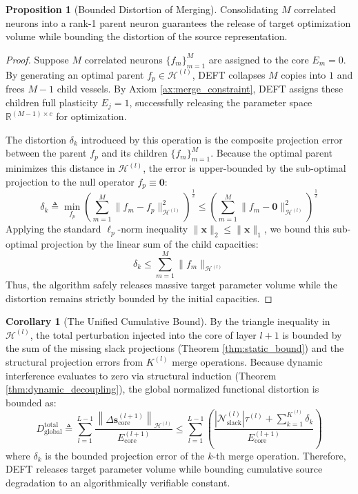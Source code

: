 \documentclass[11pt, a4paper, copyright, gdm]{google}
\newcommand{\norm}[1]{\left\lVert#1\right\rVert}
\newcommand{\sVect}{\boldsymbol{s}}
\newcommand{\xVect}{\boldsymbol{x}}
\newcommand{\zeroVect}{\boldsymbol{0}}
\newcommand{\calH}{\mathcal{H}}
\newcommand{\calN}{\mathcal{N}}
\theoremstyle{definition}
\newtheorem{proposition}[theorem]{Proposition}
\newtheorem{corollary}[theorem]{Corollary}
\begin{document}
\begin{proposition}[Bounded Distortion of Merging]
\label{prop:epsilon_tradeoff}
Consolidating $M$ correlated neurons into a rank-1 parent neuron guarantees the release of target optimization volume while bounding the distortion of the source representation.
\end{proposition}

\begin{proof}
Suppose $M$ correlated neurons $\{f_m\}_{m=1}^M$ are assigned to the core $E_m = 0$. By generating an optimal parent $f_p \in \calH^{(l)}$, DEFT collapses $M$ copies into $1$ and frees $M-1$ child vessels. By Axiom \ref{ax:merge_constraint}, DEFT assigns these children full plasticity $E_j = 1$, successfully releasing the parameter space $\mathbb{R}^{(M-1) \times c}$ for optimization.

The distortion $\delta_k$ introduced by this operation is the composite projection error between the parent $f_p$ and its children $\{f_m\}_{m=1}^M$. Because the optimal parent minimizes this distance in $\calH^{(l)}$, the error is upper-bounded by the sub-optimal projection to the null operator $f_p \equiv \zeroVect$:
\begin{equation}
    \delta_k \triangleq \min_{f_p} \left( \sum_{m=1}^M \|f_m - f_p\|_{\calH^{(l)}}^2 \right)^{\frac{1}{2}} \le \left( \sum_{m=1}^M \|f_m - \zeroVect\|_{\calH^{(l)}}^2 \right)^{\frac{1}{2}}
\end{equation}
Applying the standard $\ell_p$-norm inequality $\|\xVect\|_2 \le \|\xVect\|_1$, we bound this sub-optimal projection by the linear sum of the child capacities:
\begin{equation}
    \delta_k \le \sum_{m=1}^M \|f_m\|_{\calH^{(l)}}
\end{equation}
Thus, the algorithm safely releases massive target parameter volume while the distortion remains strictly bounded by the initial capacities.
\end{proof}

\begin{corollary}[The Unified Cumulative Bound]
\label{cor:unified_bound}
By the triangle inequality in $\calH^{(l)}$, the total perturbation injected into the core of layer $l+1$ is bounded by the sum of the missing slack projections (Theorem \ref{thm:static_bound}) and the structural projection errors from $K^{(l)}$ merge operations. Because dynamic interference evaluates to zero via structural induction (Theorem \ref{thm:dynamic_decoupling}), the global normalized functional distortion is bounded as:
\begin{equation}
    D_{\text{global}}^{\text{total}} \triangleq \sum_{l=1}^{L-1} \frac{\norm{\Delta \sVect_{\text{core}}^{(l+1)}}_{\calH^{(l)}}}{E_{\text{core}}^{(l+1)}} \le \sum_{l=1}^{L-1} \left( \frac{|\calN_{\text{slack}}^{(l)}| \tau^{(l)} + \sum_{k=1}^{K^{(l)}} \delta_{k}}{E_{\text{core}}^{(l+1)}} \right)
\end{equation}
where $\delta_k$ is the bounded projection error of the $k$-th merge operation. Therefore, DEFT releases target parameter volume while bounding cumulative source degradation to an algorithmically verifiable constant.
\end{corollary}
\end{document}

